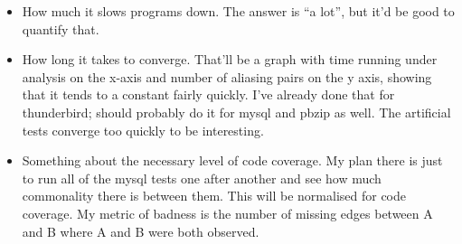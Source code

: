 \begin{itemize}
\item How much it slows programs down.  The answer is ``a lot'', but
  it'd be good to quantify that.
\item How long it takes to converge.  That'll be a graph with time
  running under analysis on the x-axis and number of aliasing pairs on
  the y axis, showing that it tends to a constant fairly quickly.
  I've already done that for thunderbird; should probably do it for
  mysql and pbzip as well.  The artificial tests converge too quickly
  to be interesting.
\item Something about the necessary level of code coverage.  My plan
  there is just to run all of the mysql tests one after another and
  see how much commonality there is between them.  This will be
  normalised for code coverage.  My metric of badness is the number of
  missing edges between A and B where A and B were both observed.
\end{itemize}
